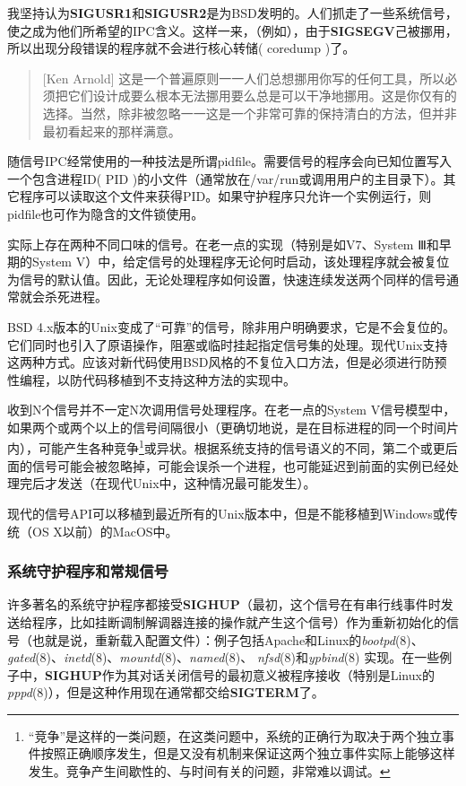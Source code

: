 \documentclass[12pt,oneside]{book}
\begin{document}
\begin{common-format}
我坚持认为\textbf{SIGUSR1}和\textbf{SIGUSR2}是为BSD发明的。人们抓走了一些系统信号，使之成为他们所希望的IPC含义。这样一来，（例如），由于\textbf{SIGSEGV}己被挪用，所以出现分段错误的程序就不会进行核心转储( coredump )了。

\begin{quote}[Ken Arnold]
这是一个普遍原则一一人们总想挪用你写的任何工具，所以必须把它们设计成要么根本无法挪用要么总是可以干净地挪用。这是你仅有的选择。当然，除非被忽略一一这是一个非常可靠的保持清白的方法，但并非最初看起来的那样满意。
\end{quote}

随信号IPC经常使用的一种技法是所谓pidfile。需要信号的程序会向已知位置写入一个包含进程ID( PID )的小文件（通常放在/var/run或调用用户的主目录下）。其它程序可以读取这个文件来获得PID。如果守护程序只允许一个实例运行，则pidfile也可作为隐含的文件锁使用。

实际上存在两种不同口味的信号。在老一点的实现（特别是如V7、System Ⅲ和早期的System V）中，给定信号的处理程序无论何时启动，该处理程序就会被复位为信号的默认值。因此，无论处理程序如何设置，快速连续发送两个同样的信号通常就会杀死进程。

BSD 4.x版本的Unix变成了“可靠”的信号，除非用户明确要求，它是不会复位的。它们同时也引入了原语操作，阻塞或临时挂起指定信号集的处理。现代Unix支持这两种方式。应该对新代码使用BSD风格的不复位入口方法，但是必须进行防预性编程，以防代码移植到不支持这种方法的实现中。

收到N个信号并不一定N次调用信号处理程序。在老一点的System V信号模型中，如果两个或两个以上的信号间隔很小（更确切地说，是在目标进程的同一个时间片内），可能产生各种竞争\footnote{“竞争”是这样的一类问题，在这类问题中，系统的正确行为取决于两个独立事件按照正确顺序发生，但是又没有机制来保证这两个独立事件实际上能够这样发生。竞争产生间歇性的、与时间有关的问题，非常难以调试。}或异状。根据系统支持的信号语义的不同，第二个或更后面的信号可能会被忽略掉，可能会误杀一个进程，也可能延迟到前面的实例已经处理完后才发送（在现代Unix中，这种情况最可能发生）。

现代的信号API可以移植到最近所有的Unix版本中，但是不能移植到Windows或传统（OS X以前）的MacOS中。


\subsubsection{系统守护程序和常规信号}
许多著名的系统守护程序都接受\textbf{SIGHUP}（最初，这个信号在有串行线事件时发送给程序，比如挂断调制解调器连接的操作就产生这个信号）作为重新初始化的信号（也就是说，重新载入配置文件）：例子包括Apache和Linux的\textit{bootpd}(8)、\textit{gated}(8)、\textit{inetd}(8)、\textit{mountd}(8)、\textit{named}(8)、 \textit{nfsd}(8)和\textit{ypbind}(8) 实现。在一些例子中，\textbf{SIGHUP}作为其对话关闭信号的最初意义被程序接收（特别是Linux的\textit{pppd}(8)），但是这种作用现在通常都交给\textbf{SIGTERM}了。


\end{common-format}
\end{document}
